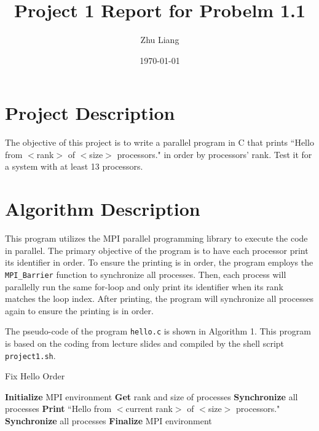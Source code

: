 \documentclass[12pt,a4paper]{article}
\title{Project 1 Report for Probelm 1.1}
\author{Zhu Liang}
\date{\today}
\begin{document}
\maketitle

\section{Project Description}
The objective of this project is to write a parallel program in C that prints ``Hello from $<$rank$>$ of $<$size$>$ processors." in order by processors' rank. 
Test it for a system with at least 13 processors.

\section{Algorithm Description}
This program utilizes the MPI parallel programming library to execute the code in parallel.
The primary objective of the program is to have each processor print its identifier in order. 
To ensure the printing is in order, the program employs the \texttt{MPI\_Barrier} function to synchronize all processes.
Then, each process will parallelly run the same for-loop and only print its identifier when its rank matches the loop index. 
After printing, the program will synchronize all processes again to ensure the printing is in order.


The pseudo-code of the program \texttt{hello.c} is shown in Algorithm 1. 
This program is based on the coding from lecture slides \cite{deng2023principles} and compiled by the shell script \texttt{project1.sh}.

\begin{algorithm}
    \caption{Fix Hello Order}
    \begin{algorithmic}[1]
    \State \textbf{Initialize} MPI environment
    \State \textbf{Get} rank and size of processes
    \State \textbf{Synchronize} all processes
            \State \textbf{Print} ``Hello from $<$current rank$>$ of $<$size$>$ processors."
        \EndIf
        \State \textbf{Synchronize} all processes
    \EndFor
    \State \textbf{Finalize} MPI environment
    \EndProcedure
    \end{algorithmic}
\end{algorithm}
\end{document}
